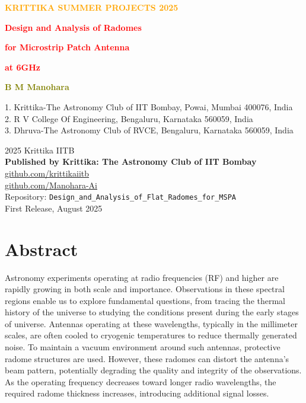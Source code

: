 \documentclass[11pt,a4paper]{report}
\begin{document}
\vspace*{2cm}
{\Large \textcolor{orange}{\textbf{KRITTIKA SUMMER PROJECTS 2025}} \par}
\vspace{1cm}
{\Huge \bfseries \textcolor{red}{Design and Analysis of Radomes} \par}
\vspace{0.2cm}
{\Huge \bfseries \textcolor{red}{for Microstrip Patch Antenna} \par}
\vspace{0.2cm}
{\Huge \bfseries \textcolor{red}{at 6GHz} \par}
\vspace{1.5cm}
{\large \textbf{\textcolor{olive}{B M Manohara}} \par}
\vspace{1.5cm}

\begin{flushleft}
1. Krittika-The Astronomy Club of IIT Bombay, Powai, Mumbai 400076, India \\
2. R V College Of Engineering, Bengaluru, Karnataka 560059, India \\
3. Dhruva-The Astronomy Club of RVCE, Bengaluru, Karnataka 560059, India
\end{flushleft}

\vfill
\begin{flushleft}
\footnotesize
\textcopyright{} 2025 Krittika IITB \\
    \textbf{Published by Krittika: The Astronomy Club of IIT Bombay} \\[0.5em]
    \href{https://github.com/krittikaiitb}{github.com/krittikaiitb} \\
    \href{https://github.com/Manohara-Ai}{github.com/Manohara-Ai} \\
    Repository: \texttt{Design\_and\_Analysis\_of\_Flat\_Radomes\_for\_MSPA} \\[0.5em]
    First Release, August 2025
\end{flushleft}

\cleardoublepage
\thispagestyle{empty}
\null
\newpage

\chapter*{Abstract}

Astronomy experiments operating at radio frequencies (RF) and higher are rapidly growing in both scale and importance. Observations in these spectral regions enable us to explore fundamental questions, from tracing the thermal history of the universe to studying the conditions present during the early stages of universe. Antennas operating at these wavelengths, typically in the millimeter scales, are often cooled to cryogenic temperatures to reduce thermally generated noise. To maintain a vacuum environment around such antennas, protective radome structures are used. However, these radomes can distort the antenna’s beam pattern, potentially degrading the quality and integrity of the observations. As the operating frequency decreases toward longer radio wavelengths, the required radome thickness increases, introducing additional signal losses.
\end{document}
